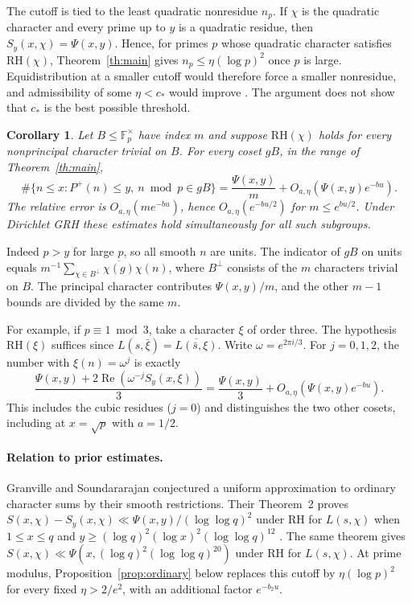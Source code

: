 \documentclass[11pt]{article}
\newtheorem{corollary}{Corollary}
\newcommand{\cstar}{c_*}
\newcommand{\re}{\operatorname{Re}}
\begin{document}
The cutoff is tied to the least quadratic nonresidue \(n_p\). If
\(\chi\) is the quadratic character and every prime up to \(y\) is a
quadratic residue, then \(S_y(x,\chi)=\Psi(x,y)\). Hence, for primes
\(p\) whose quadratic character satisfies \(\mathrm{RH}(\chi)\),
Theorem~\ref{th:main} gives \(n_p\le\eta(\log p)^2\) once \(p\) is large.
Equidistribution at a smaller cutoff would therefore force a smaller
nonresidue, and admissibility of some \(\eta<\cstar\) would improve
\cite[Theorem 1]{cmqr}. The argument does not show that \(\cstar\) is
the best possible threshold.

\begin{corollary}\label{cor:cosets}
Let \(B\le\mathbb F_p^\times\) have index \(m\) and suppose
\(\mathrm{RH}(\chi)\) holds for every nonprincipal character trivial
on \(B\). For every coset \(gB\), in the range of Theorem~\ref{th:main},
\[
 \#\{n\le x:P^+(n)\le y,\ n\bmod p\in gB\}
 =\frac{\Psi(x,y)}{m}+O_{a,\eta}(\Psi(x,y)e^{-bu}).
\]
The relative error is \(O_{a,\eta}(m e^{-bu})\), hence
\(O_{a,\eta}(e^{-bu/2})\) for \(m\le e^{bu/2}\). Under Dirichlet
GRH these estimates hold simultaneously for all such subgroups.
\end{corollary}
Indeed \(p>y\) for large \(p\), so all smooth \(n\) are units. The
indicator of \(gB\) on units equals
\(m^{-1}\sum_{\chi\in B^\perp}\overline{\chi(g)}\chi(n)\), where
\(B^\perp\) consists of the \(m\) characters trivial on \(B\).
The principal character contributes \(\Psi(x,y)/m\), and the other
\(m-1\) bounds are divided by the same \(m\).

For example, if \(p\equiv1\bmod3\), take a character \(\xi\) of order
three. The hypothesis \(\mathrm{RH}(\xi)\) suffices since
\(L(s,\bar\xi)=\overline{L(\bar s,\xi)}\). Write
\(\omega=e^{2\pi i/3}\). For \(j=0,1,2\), the number with
\(\xi(n)=\omega^j\) is exactly
\[
 \frac{\Psi(x,y)+2\re(\omega^{-j}S_y(x,\xi))}{3}
 =\frac{\Psi(x,y)}3+O_{a,\eta}(\Psi(x,y)e^{-bu}).
\]
This includes the cubic residues (\(j=0\)) and distinguishes the two
other cosets, including at \(x=\sqrt p\) with \(a=1/2\).

\paragraph{Relation to prior estimates.}
Granville and Soundararajan conjectured a uniform approximation to
ordinary character sums by their smooth restrictions. Their Theorem~2
proves \(S(x,\chi)-S_y(x,\chi)\ll\Psi(x,y)/(\log\log q)^2\) under
RH for \(L(s,\chi)\) when \(1\le x\le q\) and
\(y\ge(\log q)^2(\log x)^2(\log\log q)^{12}\)
\cite[Conjecture 1 and Theorem 2]{gs}. The same theorem gives
\(S(x,\chi)\ll\Psi(x,(\log q)^2(\log\log q)^{20})\) under RH for
\(L(s,\chi)\). At prime modulus, Proposition~\ref{prop:ordinary} below
replaces this cutoff by \(\eta(\log p)^2\) for every fixed
\(\eta>2/e^2\), with an additional factor \(e^{-b_2u}\).
\end{document}
